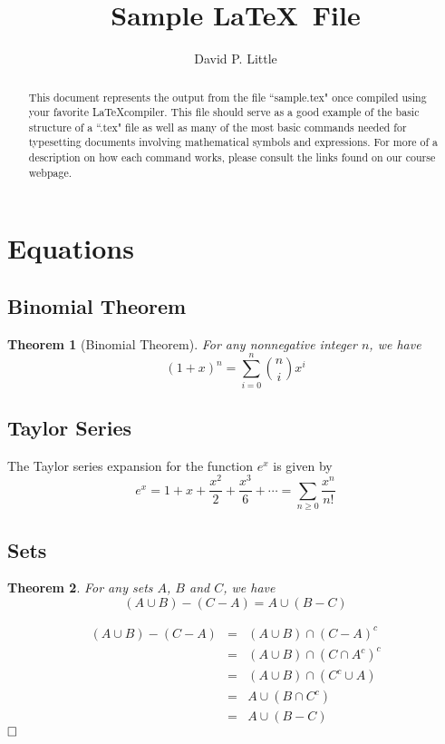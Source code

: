 \documentclass[]{article}
\newtheorem{theorem}{Theorem}
\newenvironment{proof}{\noindent{\bf Proof:}}{$\hfill \Box$ \vspace{10pt}}
\begin{document}
\title{Sample \LaTeX ~File}
\author{David P. Little}
\maketitle

\begin{abstract}
This document represents the output from the file ``sample.tex" once compiled using your favorite \LaTeX compiler.  This file should serve as a good example of the basic structure of a ``.tex" file as well as many of the most basic commands needed for typesetting documents involving mathematical symbols and expressions.  For more of a description on how each command works, please consult the links found on our course webpage.
\end{abstract}







\section{Equations}

\subsection{Binomial Theorem}
\begin{theorem}[Binomial Theorem]
For any nonnegative integer $n$, we have
$$(1+x)^n = \sum_{i=0}^n {n \choose i} x^i$$
\end{theorem}

\subsection{Taylor Series}
The Taylor series expansion for the function $e^x$ is given by
\begin{equation}
e^x = 1 + x + \frac{x^2}{2} + \frac{x^3}{6} + \cdots = \sum_{n\geq 0} \frac{x^n}{n!}
\end{equation}


\subsection{Sets}

\begin{theorem}
For any sets $A$, $B$ and $C$, we have
$$ (A\cup B)-(C-A) = A \cup (B-C)$$
\end{theorem}

\begin{proof}
\begin{eqnarray*}
(A\cup B)-(C-A) &=& (A\cup B) \cap (C-A)^c\\
&=& (A\cup B) \cap (C \cap A^c)^c \\
&=& (A\cup B) \cap (C^c \cup A) \\
&=& A \cup (B\cap C^c) \\
&=& A \cup (B-C)
\end{eqnarray*}
\end{proof}
\end{document}
